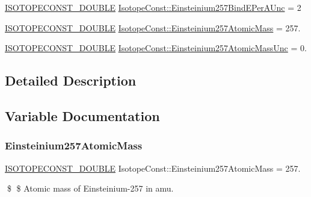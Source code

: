 \begin{DoxyCompactItemize}
\mbox{\hyperlink{group___isotope_const-_macros_ga8f45a7272ce02c0b4c65c44636ed719a}{I\+S\+O\+T\+O\+P\+E\+C\+O\+N\+S\+T\+\_\+\+D\+O\+U\+B\+LE}} \mbox{\hyperlink{group___isotope_const-_einsteinium-_es257_gadb5090277fc45852ca2118ea42b5f502}{Isotope\+Const\+::\+Einsteinium257\+Bind\+E\+Per\+A\+Unc}} = 2
\item 
\mbox{\hyperlink{group___isotope_const-_macros_ga8f45a7272ce02c0b4c65c44636ed719a}{I\+S\+O\+T\+O\+P\+E\+C\+O\+N\+S\+T\+\_\+\+D\+O\+U\+B\+LE}} \mbox{\hyperlink{group___isotope_const-_einsteinium-_es257_ga803712708f0de1eee7c1be283906cf04}{Isotope\+Const\+::\+Einsteinium257\+Atomic\+Mass}} = 257.
\item 
\mbox{\hyperlink{group___isotope_const-_macros_ga8f45a7272ce02c0b4c65c44636ed719a}{I\+S\+O\+T\+O\+P\+E\+C\+O\+N\+S\+T\+\_\+\+D\+O\+U\+B\+LE}} \mbox{\hyperlink{group___isotope_const-_einsteinium-_es257_gac02ee85e40d52256e41d576a1ffbac31}{Isotope\+Const\+::\+Einsteinium257\+Atomic\+Mass\+Unc}} = 0.
\end{DoxyCompactItemize}


\subsection{Detailed Description}


\subsection{Variable Documentation}
\mbox{\label{group___isotope_const-_einsteinium-_es257_ga803712708f0de1eee7c1be283906cf04}} 
\subsubsection{\texorpdfstring{Einsteinium257\+Atomic\+Mass}{Einsteinium257AtomicMass}}
{\footnotesize\ttfamily \mbox{\hyperlink{group___isotope_const-_macros_ga8f45a7272ce02c0b4c65c44636ed719a}{I\+S\+O\+T\+O\+P\+E\+C\+O\+N\+S\+T\+\_\+\+D\+O\+U\+B\+LE}} Isotope\+Const\+::\+Einsteinium257\+Atomic\+Mass = 257.}

\$ \$ Atomic mass of Einsteinium-\/257 in amu. \mbox{\label{group___isotope_const-_einsteinium-_es257_gac02ee85e40d52256e41d576a1ffbac31}} 
